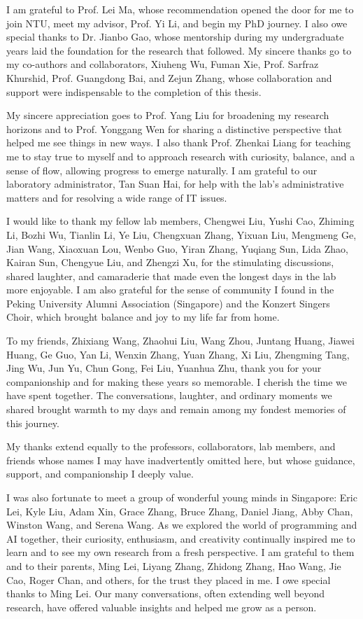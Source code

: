 \documentclass[12pt,a4paper]{Thesis} %
\begin{document}
{I am grateful to Prof. Lei Ma, whose recommendation opened the door for me to join NTU, meet my advisor, Prof. Yi Li, and begin my PhD journey. I also owe special thanks to Dr. Jianbo Gao, whose mentorship during my undergraduate years laid the foundation for the research that followed. My sincere thanks go to my co-authors and collaborators, Xiuheng Wu, Fuman Xie, Prof. Sarfraz Khurshid, Prof. Guangdong Bai, and Zejun Zhang, whose collaboration and support were indispensable to the completion of this thesis.

My sincere appreciation goes to Prof. Yang Liu for broadening my research horizons and to Prof. Yonggang Wen for sharing a distinctive perspective that helped me see things in new ways. I also thank Prof. Zhenkai Liang for teaching me to stay true to myself and to approach research with curiosity, balance, and a sense of flow, allowing progress to emerge naturally. I am grateful to our laboratory administrator, Tan Suan Hai, for help with the lab's administrative matters and for resolving a wide range of IT issues.

I would like to thank my fellow lab members, Chengwei Liu, Yushi Cao, Zhiming Li, Bozhi Wu, Tianlin Li, Ye Liu, Chengxuan Zhang, Yixuan Liu, Mengmeng Ge, Jian Wang, Xiaoxuan Lou, Wenbo Guo, Yiran Zhang, Yuqiang Sun, Lida Zhao, Kairan Sun, Chengyue Liu, and Zhengzi Xu, for the stimulating discussions, shared laughter, and camaraderie that made even the longest days in the lab more enjoyable. I am also grateful for the sense of community I found in the Peking University Alumni Association (Singapore) and the Konzert Singers Choir, which brought balance and joy to my life far from home.

To my friends, Zhixiang Wang, Zhaohui Liu, Wang Zhou, Juntang Huang, Jiawei Huang, Ge Guo, Yan Li, Wenxin Zhang, Yuan Zhang, Xi Liu, Zhengming Tang, Jing Wu, Jun Yu, Chun Gong, Fei Liu, Yuanhua Zhu, thank you for your companionship and for making these years so memorable. I cherish the time we have spent together. The conversations, laughter, and ordinary moments we shared brought warmth to my days and remain among my fondest memories of this journey.

My thanks extend equally to the professors, collaborators, lab members, and friends whose names I may have inadvertently omitted here, but whose guidance, support, and companionship I deeply value.

I was also fortunate to meet a group of wonderful young minds in Singapore: Eric Lei, Kyle Liu, Adam Xin, Grace Zhang, Bruce Zhang, Daniel Jiang, Abby Chan, Winston Wang, and Serena Wang. As we explored the world of programming and AI together, their curiosity, enthusiasm, and creativity continually inspired me to learn and to see my own research from a fresh perspective. I am grateful to them and to their parents, Ming Lei, Liyang Zhang, Zhidong Zhang, Hao Wang, Jie Cao, Roger Chan, and others, for the trust they placed in me. I owe special thanks to Ming Lei. Our many conversations, often extending well beyond research, have offered valuable insights and helped me grow as a person.

}
\end{document}

